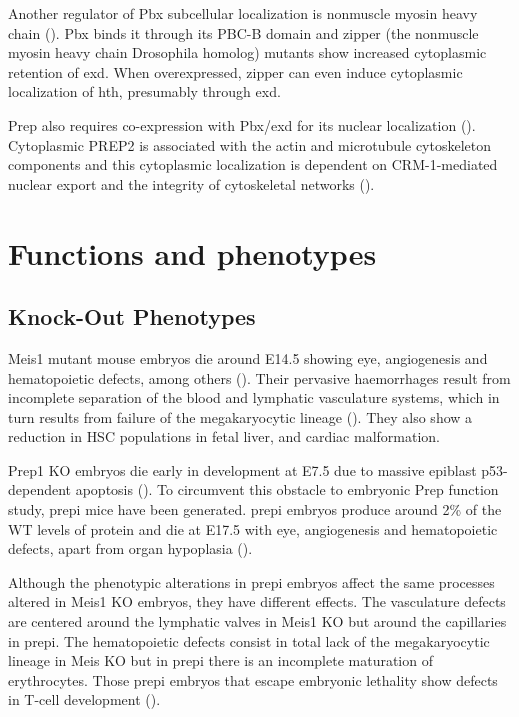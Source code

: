 Another regulator of Pbx subcellular localization is nonmuscle myosin heavy chain (\cite{Huang2003}). Pbx binds it through its PBC-B domain and zipper (the nonmuscle myosin heavy chain Drosophila homolog) mutants show increased cytoplasmic retention of \ac{exd}. When overexpressed, zipper can even induce cytoplasmic localization of \ac{hth}, presumably through \ac{exd}.

Prep also requires co-expression with Pbx/exd for its nuclear localization (\cite{Berthelsen1999}). Cytoplasmic PREP2 is associated with the actin and microtubule cytoskeleton components and this cytoplasmic localization is dependent on CRM-1-mediated nuclear export and the integrity of cytoskeletal networks (\cite{Haller2004}).


\section{Functions and phenotypes}

\subsection{Knock-Out Phenotypes}

Meis1 mutant mouse embryos die around E14.5 showing eye, angiogenesis and hematopoietic defects, among others (\cite{Hisa2004, Azcoitia2005}). Their pervasive haemorrhages result from incomplete separation of the blood and lymphatic vasculature systems, which in turn results from failure of the megakaryocytic lineage (\cite{Carramolino2010}). They also show a reduction in \ac{HSC} populations in fetal liver, and cardiac malformation. 

Prep1 \ac{KO} embryos die early in development at E7.5 due to massive epiblast p53-dependent apoptosis (\cite{Fernandez-Diaz2010}). To circumvent this obstacle to embryonic Prep function study, \ac{prepi} mice have been generated. \ac{prepi} embryos produce around 2\% of the \ac{WT} levels of protein and die at E17.5 with eye, angiogenesis and hematopoietic defects, apart from organ hypoplasia (\cite{Ferretti2006, DiRosa2007}).  

Although the phenotypic alterations in \ac{prepi} embryos affect the same processes altered in Meis1 \ac {KO} embryos, they have different effects. The vasculature defects are centered around the lymphatic valves in Meis1 \ac{KO} but around the capillaries in \ac{prepi}. The hematopoietic defects consist in total lack of the megakaryocytic lineage in Meis \ac{KO} but in  \ac{prepi} there is an incomplete maturation of erythrocytes. Those \ac{prepi} embryos that escape embryonic lethality show defects in T-cell development (\cite{Penkov2005}). 

